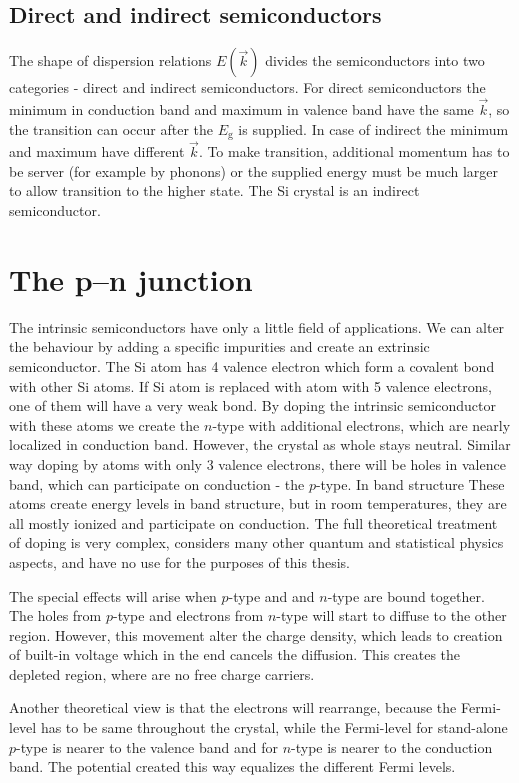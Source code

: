\subsection{Direct and indirect semiconductors}
 
The shape of dispersion relations $E(\vec{k})$ divides the semiconductors into two categories - direct and indirect semiconductors. For direct semiconductors the minimum in conduction band and maximum in valence band have the same $\vec{k}$, so the transition can occur after the $E_{\textrm{g}}$ is supplied. In case of indirect the minimum and maximum have different $\vec{k}$. To make transition, additional momentum has to be server (for example by phonons) or the supplied energy must be much larger to allow transition to the higher state. %
The Si crystal is an indirect semiconductor.


 
\section{The p–n junction}
The intrinsic semiconductors have only a little field of applications. We can alter the behaviour by adding a specific impurities and create an extrinsic semiconductor. The Si atom has 4 valence electron which form a covalent bond with other Si atoms. If Si atom is replaced with atom with 5 valence electrons, one of them will have a very weak bond.
By doping the intrinsic semiconductor with these atoms we create the $n$-type with additional electrons, which are nearly localized in conduction band. However, the crystal as whole stays neutral. Similar way doping by atoms with only 3 valence electrons, there will be holes in valence band, which can participate on conduction - the $p$-type.
In band structure These atoms create energy levels in band structure, but in room temperatures, they are all mostly ionized and participate on conduction. The full theoretical treatment of doping is very complex, considers many other quantum and statistical physics aspects, and have no use for the purposes of this thesis. 

\par
The special effects will arise when $p$-type and and $n$-type are bound together. The holes from $p$-type and electrons from $n$-type will start to diffuse to the other region. However, this movement alter the charge density, which leads to creation of built-in voltage which in the end cancels the diffusion. This creates the depleted region, where are no free charge carriers. 
\par
Another theoretical view is that the electrons will rearrange, because the Fermi-level has to be same throughout the crystal, while the Fermi-level for stand-alone $p$-type is nearer to the valence band and for $n$-type is nearer to the conduction band. The potential created this way equalizes the different Fermi levels. 


